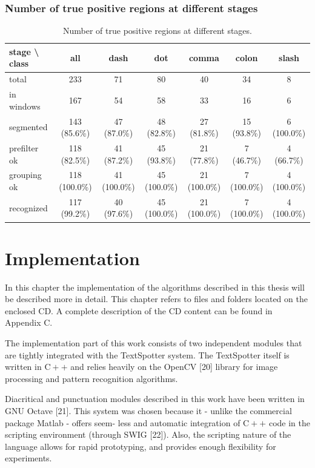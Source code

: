 \documentclass[12pt,a4paper]{report}
\begin{document}
\subsection{Number of true positive regions at different stages}
\begin{table}[htbp]
    \centering
    \begin{tabular}{lcccccc}
        \toprule
        stage \textbackslash{} class & all & dash & dot & comma & colon & slash \\
        \midrule
        total & 233 & 71 & 80 & 40 & 34 & 8 \\
        in windows & 167 & 54 & 58 & 33 & 16 & 6 \\
        segmented & 143 (85.6\%) & 47 (87.0\%) & 48 (82.8\%) & 27 (81.8\%) & 15 (93.8\%) & 6 (100.0\%) \\
        prefilter ok & 118 (82.5\%) & 41 (87.2\%) & 45 (93.8\%) & 21 (77.8\%) & 7 (46.7\%) & 4 (66.7\%) \\
        grouping ok & 118 (100.0\%) & 41 (100.0\%) & 45 (100.0\%) & 21 (100.0\%) & 7 (100.0\%) & 4 (100.0\%) \\
        recognized & 117 (99.2\%) & 40 (97.6\%) & 45 (100.0\%) & 21 (100.0\%) & 7 (100.0\%) & 4 (100.0\%) \\
        \bottomrule
    \end{tabular}
    \caption{Number of true positive regions at different stages.}
    \label{tab:punctuation-stages}
\end{table}

\chapter{Implementation}
In this chapter the implementation of the algorithms described in this thesis will be described more in detail. This chapter refers to files and folders located on the enclosed CD. A complete description of the CD content can be found in Appendix C.

The implementation part of this work consists of two independent modules that are tightly integrated with the TextSpotter system. The TextSpotter itself is written in $\mathrm{C++}$ and relies heavily on the OpenCV [20] library for image processing and pattern recognition algorithms.

Diacritical and punctuation modules described in this work have been written in GNU Octave [21]. This system was chosen because it - unlike the commercial package Matlab - offers seem- less and automatic integration of $\mathrm{C++}$ code in the scripting environment (through SWIG [22]). Also, the scripting nature of the language allows for rapid prototyping, and provides enough flexibility for experiments.
\end{document}
